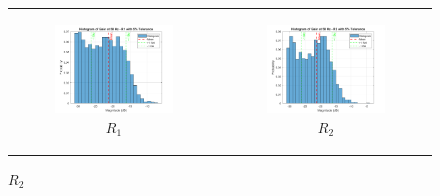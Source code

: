 \documentclass[hidelinks,12pt]{article}
\begin{document}
	\pagebreak
	
	\begin{figure}[!h]
		\centering
		\begin{tabular}{cc}
			\begin{subfigure}[h]{0.45\textwidth}
				\centering
				\includegraphics[width=\textwidth]{figures/5_percent/r1.png}
				\caption{$R_1$}
			\end{subfigure} &
			\begin{subfigure}[h]{0.45\textwidth}
				\centering
				\includegraphics[width=\textwidth]{figures/5_percent/r2.png}
				\caption{$R_2$}
			\end{subfigure} \\[0.3cm]
			

\end{tabular}
\end{figure}
\end{document}
